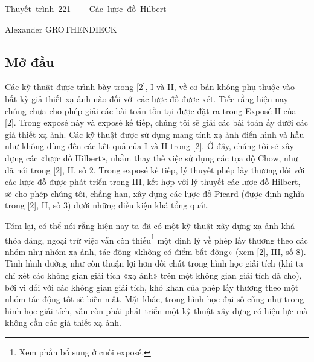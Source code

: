 \unit{Thuyết trình 221 -- Các lược đồ Hilbert}
%
  {Alexander GROTHENDIECK}

\subsection*{Mở đầu}

Các kỹ thuật được trình bày trong [2], I và II, về cơ bản không phụ thuộc vào
bất kỳ giả thiết xạ ảnh nào đối với các lược đồ được xét. Tiếc rằng hiện nay
chúng chưa cho phép giải các bài toán tồn tại được đặt ra trong Exposé II của
[2]. Trong exposé này và exposé kế tiếp, chúng tôi sẽ giải các bài toán ấy dưới
các giả thiết xạ ảnh. Các kỹ thuật được sử dụng mang tính xạ ảnh điển hình và
hầu như không dùng đến các kết quả của I và II trong [2]. Ở đây, chúng tôi sẽ
xây dựng các «lược đồ Hilbert», nhằm thay thế việc sử dụng các tọa độ Chow, như
đã nói trong [2], II, số 2. Trong exposé kế tiếp, lý thuyết phép lấy thương đối
với các lược đồ được phát triển trong III, kết hợp với lý thuyết các lược đồ
Hilbert, sẽ cho phép chúng tôi, chẳng hạn, xây dựng các lược đồ Picard (được
định nghĩa trong [2], II, số 3) dưới những điều kiện khá tổng quát.

Tóm lại, có thể nói rằng hiện nay ta đã có một kỹ thuật xây dựng xạ ảnh khá
thỏa đáng, ngoại trừ việc vẫn còn thiếu\footnote{Xem phần bổ sung ở cuối
exposé.} một định lý về phép lấy thương theo các nhóm như nhóm xạ ảnh, tác động
«không có điểm bất động» (xem [2], III, số 8). Tình hình dường như còn thuận lợi
hơn đôi chút trong hình học giải tích (khi ta chỉ xét các không gian giải tích
«xạ ảnh» trên một không gian giải tích đã cho), bởi vì đối với các không gian
giải tích, khó khăn của phép lấy thương theo một nhóm tác động tốt sẽ biến mất.
Mặt khác, trong hình học đại số cũng như trong hình học giải tích, vẫn còn phải
phát triển một kỹ thuật xây dựng có hiệu lực mà không cần các giả thiết xạ ảnh.


